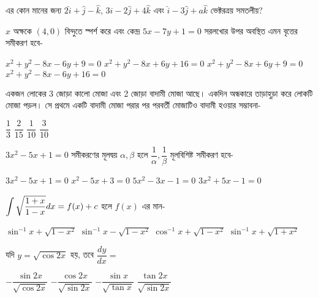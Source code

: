 \documentclass[addpoints]{exam}
\begin{document}
\begin{questions}
\question  {} এর কোন মানের জন্য $ 2\hat{i}+\hat{j}-\hat{k},\, 3\hat{i}-2\hat{j}+4\hat{k} $ এবং $ \hat{i}-3\hat{j}+a\hat{k} $ ভেক্টরত্রয় সমতলীয়?


\begin{oneparchoices}

\end{oneparchoices}

\question  $ x $ অক্ষকে $ (4,0) $ বিন্দুতে স্পর্শ করে এবং কেন্দ্র $ 5x-7y+1=0 $ সরলখোর উপর অবস্থিত এমন বৃত্তের সমীকরণ হবে-

\begin{oneparchoices}
\choice $ x^{2}+y^{2}-8x-6y+9=0 $
\choice $ x^{2}+y^{2}-8x+6y+16=0 $
\choice $ x^{2}+y^{2}-8x+6y+9=0 $
\choice $ x^{2}+y^{2}-8x-6y+16=0 $

\end{oneparchoices}

\question একজন লোকের 3 জোড়া কালো মোজা এবং 2 জোড়া বাদামী মোজা আছে। একদিন অন্ধকারে তাড়াহুড়া করে লোকটি মোজা পড়ল। সে প্রথমে একটি বাদামী মোজা পরার পর পরবর্তী মোজাটিও বাদামী হওয়ার সম্ভাবনা-

\begin{oneparchoices}
\choice $ \dfrac{1}{3} $
\choice $ \dfrac{2}{15} $
\choice $ \dfrac{1}{10} $
\choice $ \dfrac{3}{10} $
\end{oneparchoices}

\question $ 3x^{2}-5x+1=0 $ সমীকরণের মূলদ্বয় $ \alpha, \beta $ হলে $ \dfrac{1}{\alpha}, \dfrac{1}{\beta} $ মূলবিশিষ্ট সমীকরণ হবে-

\begin{oneparchoices}
\choice $ 3x^{2}-5x+1=0 $
\choice $ x^{2}-5x+3=0 $
\choice $ 5x^{2}-3x-1=0 $
\choice $ 3x^{2}+5x-1=0 $
\end{oneparchoices}


\question $ \mathlarger{\int\sqrt{\dfrac{1+x}{1-x}}dx = f(x)+c} $ হলে $ f(x) $ এর মান-

\begin{oneparchoices}
\choice $ \sin^{-1}x + \sqrt{1-x^{2}} $
\choice $ \sin^{-1}x - \sqrt{1-x^{2}} $
\choice $ \cos^{-1}x + \sqrt{1-x^{2}} $
\choice $ \sin^{-1}x + \sqrt{1+x^{2}} $
\end{oneparchoices}

\question যদি $ y = \sqrt{\cos 2x} $ হয়, তবে $ \dfrac{dy}{dx} = $ 

\begin{oneparchoices}
\choice $ -\dfrac{\sin 2x}{\sqrt{\cos 2x}}  $
\choice $ -\dfrac{\cos 2x}{\sqrt{\sin 2x}}  $
\choice $ -\dfrac{\sin x}{\sqrt{\tan x}}  $
\choice $ \dfrac{\tan 2x}{\sqrt{\sin 2x}}  $
\end{oneparchoices}


\end{questions}
\end{document}

